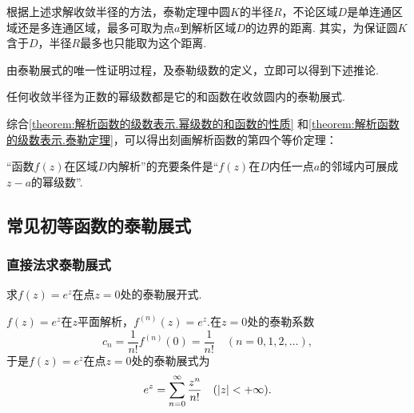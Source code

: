 根据上述求解收敛半径的方法，泰勒定理中圆\(K\)的半径\(R\)，不论区域\(D\)是单连通区域还是多连通区域，最多可取为点\(a\)到解析区域\(D\)的边界的距离.
其实，为保证圆\(K\)含于\(D\)，半径\(R\)最多也只能取为这个距离.

由泰勒展式的唯一性证明过程，及泰勒级数的定义，立即可以得到下述推论.
\begin{corollary}
任何收敛半径为正数的幂级数都是它的和函数在收敛圆内的泰勒展式.
\end{corollary}

综合\cref{theorem:解析函数的级数表示.幂级数的和函数的性质} 和\cref{theorem:解析函数的级数表示.泰勒定理}，可以得出刻画解析函数的第四个等价定理：
\begin{theorem}
“函数\(f(z)\)在区域\(D\)内解析”的充要条件是“\(f(z)\)在\(D\)内任一点\(a\)的邻域内可展成\(z-a\)的幂级数”.
\end{theorem}

\subsection{常见初等函数的泰勒展式}
\subsubsection{直接法求泰勒展式}
\begin{example}
求\(f(z) = e^z\)在点\(z = 0\)处的泰勒展开式.
\begin{solution}
\(f(z) = e^z\)在\(z\)平面解析，\(f^{(n)}(z) = e^z\).在\(z = 0\)处的泰勒系数\[
c_n = \frac{1}{n!} f^{(n)}(0) = \frac{1}{n!}
\quad(n=0,1,2,\dotsc),
\]于是\(f(z) = e^z\)在点\(z = 0\)处的泰勒展式为\begin{equation}\label{equation:解析函数的级数表示.指数函数的泰勒展式}
e^z = \sum\limits_{n=0}^{\infty} \frac{z^n}{n!}
\quad(\abs{z} < +\infty).
\end{equation}
\end{solution}
\end{example}


